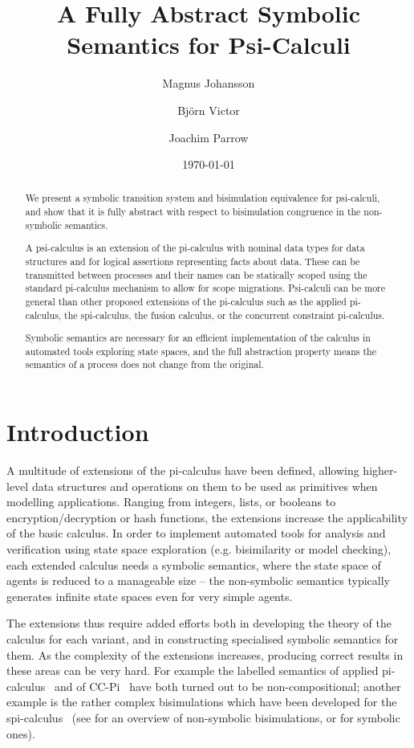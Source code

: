 \documentclass{eptcs}
\title{A Fully Abstract Symbolic Semantics for Psi-Calculi}
\author{Magnus Johansson \and Bj{\"o}rn Victor \and Joachim Parrow}
\date{\today}
\theoremstyle{definition}
\begin{document}
\maketitle

\begin{abstract}
We present a symbolic transition system and bisimulation equivalence
for psi-calculi, and show that it is fully
abstract with respect to bisimulation congruence in the non-symbolic semantics.

A psi-calculus is an extension of the pi-calculus with nominal data
types for data structures and for logical assertions representing
facts about data. These can be transmitted between processes and their
names can be statically scoped using the standard pi-calculus
mechanism to allow for scope migrations.
Psi-calculi can be more general than other proposed extensions of the
pi-calculus such as the applied pi-calculus, the spi-calculus, the
fusion calculus, or the concurrent constraint pi-calculus.

Symbolic semantics are necessary for an efficient implementation of
the calculus in automated tools exploring state spaces, and the full abstraction property means the
semantics of a process does not change from the original.
\end{abstract}

\section{Introduction}\label{sec:introduction}


A multitude of extensions of the pi-calculus have been defined,
allowing higher-level data structures and operations on them to be
used as primitives when modelling applications.  Ranging from
integers, lists, or booleans to encryption/decryption or hash
functions, the extensions increase the applicability of the basic calculus.
In order to implement automated tools for analysis and verification 
using state space exploration (e.g. bisimilarity or model checking),
each extended calculus needs a symbolic semantics, where the state space of
agents is reduced to a manageable size -- the non-symbolic semantics
typically generates infinite state spaces even for very simple agents. 

The extensions thus require added efforts both in developing the
theory of the calculus for each variant, and in constructing
specialised symbolic semantics for them.
As the complexity of the extensions increases, producing correct
results in these areas can be very hard. 
For example the labelled semantics of applied
pi-calculus~\cite{abadi.fournet:mobile-values} and of
CC-Pi~\cite{buscemi.montanari:open-bisimulation} have both turned out
to be non-compositional; another example is the rather complex  
bisimulations which have been developed for the
spi-calculus~\cite{abadi.gordon:calculus-cryptographic} (see
\cite{borgstrom.nestmann:bisimulations-spi} for an overview of
non-symbolic bisimulations, or
\cite{borgstroem.briais.ea:symbolic-bisimulation,briais:theory-tool,borgstroem:equivalences-calculi}
for symbolic ones).
\end{document}

